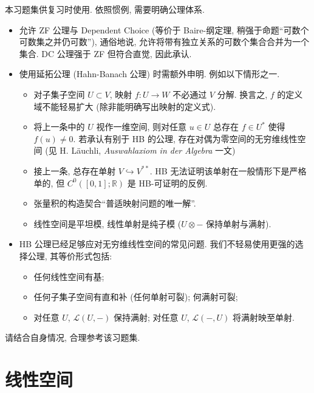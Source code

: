 \documentclass{MainStyle}
\theoremstyle{definition}
\begin{document}
\maketitle
\noindent 本习题集供复习时使用. 依照惯例, 需要明确公理体系.
\begin{itemize}
    \item  允许 ZF 公理与 Dependent Choice (等价于 Baire-纲定理, 稍强于命题``可数个可数集之并仍可数''), 通俗地说, 允许将带有独立关系的可数个集合合并为一个集合. DC 公理强于 ZF 但符合直觉, 因此承认.
    \item 使用延拓公理 (Hahn-Banach 公理) 时需额外申明. 例如以下情形之一.
          \begin{itemize}
              \item 对子集子空间 $U\subset V$, 映射 $f:U\to W$ 不必通过 $V$ 分解. 换言之, $f$ 的定义域不能轻易扩大 (除非能明确写出映射的定义式).
              \item 将上一条中的 $U$ 视作一维空间, 则对任意 $u\in U$ 总存在 $f\in U^\ast$ 使得 $f(u)\neq 0$. 若承认有别于 HB 的公理, 存在对偶为零空间的无穷维线性空间 (见 H. Läuchli, \textit{Auswahlaxiom in der Algebra} 一文)
              \item 接上一条, 总存在单射 $V\hookrightarrow V^{\ast\ast}$. HB 无法证明该单射在一般情形下是严格单的, 但 $C^0([0,1];\mathbb R)$ 是 HB-可证明的反例.
              \item 张量积的构造契合``普适映射问题的唯一解''.
              \item 线性空间是平坦模, 线性单射是纯子模 ($U\otimes-$ 保持单射与满射).
          \end{itemize}
    \item HB 公理已经足够应对无穷维线性空间的常见问题. 我们不轻易使用更强的选择公理, 其等价形式包括:
          \begin{itemize}
              \item 任何线性空间有基;
              \item 任何子集子空间有直和补 (任何单射可裂); 何满射可裂;
              \item 对任意 $U$, $\mathcal L(U,-)$ 保持满射; 对任意 $U$, $\mathcal L(-,U)$ 将满射映至单射.
          \end{itemize}
\end{itemize}

\noindent 请结合自身情况, 合理参考该习题集.

\tableofcontents

\newpage

\section{线性空间}
\end{document}
